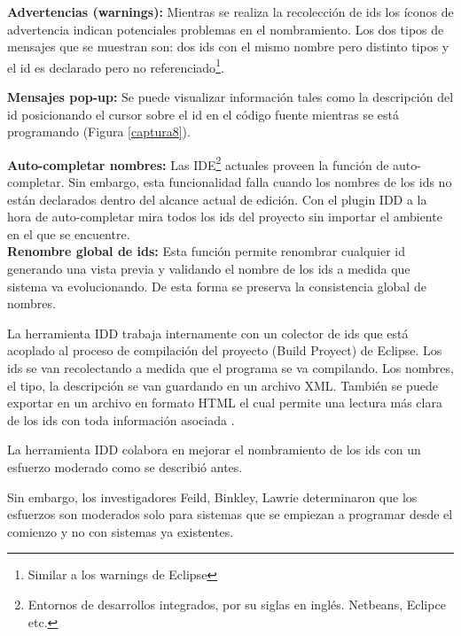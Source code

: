 \documentclass[a4paper,12pt]{report}
\begin{document}
\textbf{Advertencias (warnings):} Mientras se realiza la recolección de ids los íconos de advertencia indican potenciales problemas en el nombramiento.  Los dos tipos de mensajes que se muestran son: dos ids con el mismo nombre pero distinto tipos y el id es declarado pero no referenciado\footnote[1]{Similar a los warnings de Eclipse}.



\textbf{Mensajes pop-up:} Se puede visualizar información tales como la descripción del id posicionando el cursor sobre el id en el código fuente mientras se está programando (Figura \ref{captura8}).

\textbf{Auto-completar nombres:} Las IDE\footnote[2]{Entornos de desarrollos integrados, por su siglas en inglés. Netbeans, Eclipce etc.} actuales proveen la función de auto-completar.
Sin embargo, esta funcionalidad falla cuando los nombres de los ids no están declarados dentro del alcance actual de edición. Con el plugin IDD a la hora de auto-completar mira todos los ids del proyecto sin importar el ambiente en el que se encuentre.\\

\textbf{Renombre global de ids:} Esta función permite renombrar cualquier id generando una vista previa y validando el nombre de los ids a medida que sistema va evolucionando. De esta forma se preserva la consistencia global de nombres.

La herramienta IDD trabaja internamente con un colector de ids que está acoplado al proceso de compilación del proyecto (Build Proyect) de Eclipse. Los ids se van recolectando a medida que el programa se va compilando. Los nombres, el tipo, la descripción se van guardando en un archivo XML. También se puede exportar en un archivo en formato HTML el cual permite una lectura más clara de los ids con toda información asociada \cite{DFPM05}.



La herramienta IDD colabora en mejorar el nombramiento de los ids con un esfuerzo moderado como se describió antes. 

Sin embargo, los investigadores Feild, Binkley, Lawrie \cite{LFBEX07,DLHD06} determinaron que los esfuerzos son moderados solo para sistemas que se empiezan a programar desde el comienzo y no con sistemas ya existentes.
\end{document}
